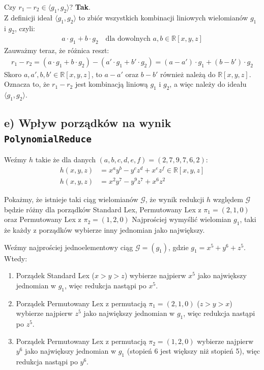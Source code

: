 \documentclass[10pt, a4paper]{article}
\begin{document}
\noindent
Czy $r_1 - r_2 \in \langle g_1, g_2 \rangle$? \textbf{Tak}.\\
Z definicji ideał $\langle g_1, g_2 \rangle$ to zbiór wszystkich kombinacji liniowych wielomianów $g_1$ i $g_2$, czyli:
\begin{align*}
    a \cdot g_1 + b \cdot g_2 \quad \text{dla dowolnych } a, b \in \mathbb{R}[x,y,z]
\end{align*}
Zauważmy teraz, że różnica reszt:
\begin{align*}
    r_1 - r_2 = (a \cdot g_1 + b \cdot g_2) - (a' \cdot g_1 + b' \cdot g_2) = (a - a') \cdot g_1 + (b - b') \cdot g_2
\end{align*}
Skoro $a,a',b,b' \in \mathbb{R}[x,y,z]$, to $a - a'$ oraz $b - b'$ również należą do $\mathbb{R}[x,y,z]$.
Oznacza to, że $r_1 - r_2$ jest kombinacją liniową $g_1$ i $g_2$, a więc należy do ideału $\langle g_1, g_2 \rangle$.

\subsection*{e) Wpływ porządków na wynik \texttt{PolynomialReduce}}

Weźmy $h$ takie że dla danych $(a,b,c,d,e,f) = (2,7,9,7,6,2)$:
\begin{align*}
    h(x,y,z) &= x^a y^b - y^c z^d + x^e z^f \in \mathbb{R}[x,y,z]\\
    h(x,y,z) &= x^2 y^7 - y^9 z^7 + x^6 z^2
\end{align*}

\noindent
Pokażmy, że istnieje taki ciąg wielomianów $\mathcal{G}$, że wynik redukcji $h$ względem $\mathcal{G}$ 
będzie różny dla porządków Standard Lex, Permutowany Lex z $\pi_1=(2,1,0)$ oraz Permutowany Lex z $\pi_2=(1,2,0)$ Najprościej wymyślić wielomian $g_1$, taki że każdy z porządków wybierze inny jednomian jako największy.

\noindent
Weźmy najprościej jednoelementowy ciąg $\mathcal{G}=(g_1)$, gdzie $g_1 = x^5 + y^6 + z^5$. Wtedy:
\begin{enumerate}
    \item Porządek Standard Lex ($x>y>z$) wybierze najpierw $x^5$ jako największy jednomian w $g_1$, więc redukcja nastąpi po $x^5$.
    \item Porządek Permutowany Lex z permutacją $\pi_1=(2,1,0)$ ($z>y>x$) wybierze najpierw $z^5$ jako największy jednomian w $g_1$, więc redukcja nastąpi po $z^5$.
    \item Porządek Permutowany Lex z permutacją $\pi_2=(1,2,0)$ wybierze najpierw $y^6$ jako największy jednomian w $g_1$ (stopień 6 jest większy niż stopień 5), więc redukcja nastąpi po $y^6$.
\end{enumerate}
\end{document}
